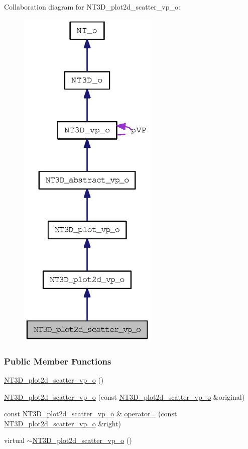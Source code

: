 Collaboration diagram for NT3D\_\-plot2d\_\-scatter\_\-vp\_\-o:
\nopagebreak
\begin{figure}[H]
\begin{center}
\leavevmode
\includegraphics[width=188pt]{class_n_t3_d__plot2d__scatter__vp__o__coll__graph}
\end{center}
\end{figure}
\subsubsection*{Public Member Functions}
\begin{DoxyCompactItemize}
\item 
\hyperlink{class_n_t3_d__plot2d__scatter__vp__o_a366b108c908d151b0a2182a7ba4b34b5}{NT3D\_\-plot2d\_\-scatter\_\-vp\_\-o} ()
\item 
\hyperlink{class_n_t3_d__plot2d__scatter__vp__o_a05fa701dcfa8ecbdd6a5ab0c61ead50b}{NT3D\_\-plot2d\_\-scatter\_\-vp\_\-o} (const \hyperlink{class_n_t3_d__plot2d__scatter__vp__o}{NT3D\_\-plot2d\_\-scatter\_\-vp\_\-o} \&original)
\item 
const \hyperlink{class_n_t3_d__plot2d__scatter__vp__o}{NT3D\_\-plot2d\_\-scatter\_\-vp\_\-o} \& \hyperlink{class_n_t3_d__plot2d__scatter__vp__o_a76d9df035d149bbbb878a4d2e748e5e2}{operator=} (const \hyperlink{class_n_t3_d__plot2d__scatter__vp__o}{NT3D\_\-plot2d\_\-scatter\_\-vp\_\-o} \&right)
\item 
virtual \hyperlink{class_n_t3_d__plot2d__scatter__vp__o_acb09900bd480abfb2bb02534906a878a}{$\sim$NT3D\_\-plot2d\_\-scatter\_\-vp\_\-o} ()
\end{DoxyCompactItemize}


